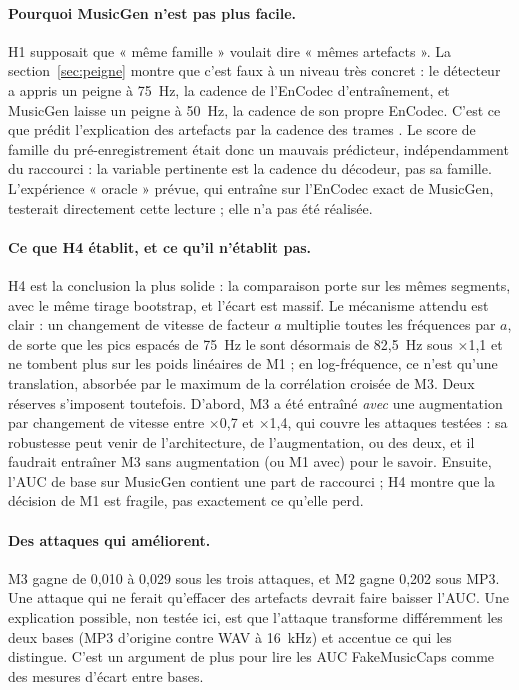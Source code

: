 \documentclass[a4paper, 11pt]{article}
\begin{document}
\paragraph{Pourquoi MusicGen n'est pas plus facile.} H1 supposait que « même famille » voulait dire
« mêmes artefacts ». La section~\ref{sec:peigne} montre que c'est faux à un niveau très concret : le
détecteur a appris un peigne à 75~Hz, la cadence de l'EnCodec d'entraînement, et MusicGen laisse un peigne à
50~Hz, la cadence de son propre EnCodec. C'est ce que prédit l'explication des artefacts par la cadence des
trames \cite{afchar2025fourier}. Le score de famille du pré-enregistrement était donc un mauvais prédicteur,
indépendamment du raccourci : la variable pertinente est la cadence du décodeur, pas sa famille.
L'expérience « oracle » prévue, qui entraîne sur l'EnCodec exact de MusicGen, testerait directement cette
lecture ; elle n'a pas été réalisée.

\paragraph{Ce que H4 établit, et ce qu'il n'établit pas.} H4 est la conclusion la plus solide : la
comparaison porte sur les mêmes segments, avec le même tirage bootstrap, et l'écart est massif. Le
mécanisme attendu est clair : un changement de vitesse de facteur $a$ multiplie toutes les fréquences par
$a$, de sorte que les pics espacés de 75~Hz le sont désormais de 82,5~Hz sous $\times$1,1 et ne tombent plus
sur les poids linéaires de M1 ; en log-fréquence, ce n'est qu'une translation, absorbée par le maximum de
la corrélation croisée de M3. Deux réserves s'imposent toutefois. D'abord, M3 a été entraîné \emph{avec}
une augmentation par changement de vitesse entre $\times$0,7 et $\times$1,4, qui couvre les attaques
testées : sa robustesse peut venir de l'architecture, de l'augmentation, ou des deux, et il faudrait
entraîner M3 sans augmentation (ou M1 avec) pour le savoir. Ensuite, l'AUC de base sur MusicGen contient
une part de raccourci ; H4 montre que la décision de M1 est fragile, pas exactement ce qu'elle perd.

\paragraph{Des attaques qui améliorent.} M3 gagne de 0,010 à 0,029 sous les trois attaques, et M2 gagne
0,202 sous MP3. Une attaque qui ne ferait qu'effacer des artefacts devrait faire baisser l'AUC. Une
explication possible, non testée ici, est que l'attaque transforme différemment les deux bases (MP3
d'origine contre WAV à 16~kHz) et accentue ce qui les distingue. C'est un argument de plus pour lire les
AUC FakeMusicCaps comme des mesures d'écart entre bases.
\end{document}
